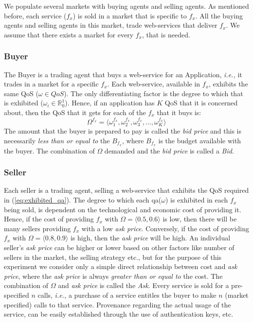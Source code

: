 \documentclass[10pt,journal,compsoc]{IEEEtran}
\begin{document}
We populate several markets with buying agents and selling agents. As mentioned before, each service ($f_{x}$) is sold in a market that is specific to $f_{x}$. All the buying agents and selling agents in this market, trade web-services that deliver $f_{x}$. We assume that there exists a market for every $f_x$, that is needed.  

\subsubsection{Buyer}
The Buyer is a trading agent that buys a web-service for an Application, \textit{i.e.,} it trades in a market for a specific $f_x$. Each web-service, available in $f_x$, exhibits the same QoS ($\omega \in QoS$). The only differentiating factor is the degree to which that is exhibited  ($ \omega_{i} \in \mathbb{R}_{0}^{1} $). Hence, if an application has $K$ QoS that it is concerned about, then the QoS that it gets for each of the $f_{x}$ that it buys is:
	 \begin{equation}
	  \Omega^{f_{x}} = \langle \omega_{1}^{f_x}, \omega_{2}^{f_x}, \omega_{3}^{f_x}, \ldots, \omega_{K}^{f_x} \rangle \label{eq:exhibited_qa}
	 \end{equation}
The amount that the buyer is prepared to pay is called the \textsl{bid price} and this is necessarily \textit{less than or equal to} the $B_{f_x}$, where $B_{f_x}$ is the budget available with the buyer. The combination of $\Omega$ demanded and the \textsl{bid price} is called a \textsl{Bid}.

\subsubsection{Seller}
Each seller is a trading agent, selling a web-service that exhibits the QoS required in (\ref{eq:exhibited_qa}). The degree to which each qa($\omega$) is exhibited in each $f_x$ being sold, is dependent on the technological and economic cost of providing it. Hence, if the cost of providing $f_x$ with $\Omega = \langle 0.5, 0.6 \rangle$ is low, then there will be many sellers providing $f_x$ with a low \textsl{ask price}. Conversely, if the cost of providing $f_x$ with $\Omega = \langle 0.8, 0.9 \rangle$ is high, then the \textsl{ask price} will be high. An individual seller's \textsl{ask price} can be higher or lower based on other factors like number of sellers in the market, the selling strategy etc., but for the purpose of this experiment we consider only a simple direct relationship between cost and \textsl{ask price}, where the \textsl{ask price} is always \textit{greater than or equal to} the cost. The combination of $\Omega$ and \textsl{ask price} is called the \textsl{Ask}. Every service is sold for a pre-specified $n$ calls, \textit{i.e.,} a purchase of a service entitles the buyer to make $n$ (market specified) calls to that service. Provenance regarding the actual usage of the service, can be easily established through the use of authentication keys, etc. 
\end{document}
